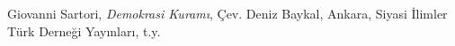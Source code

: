 \begin{thebibliography}{99}
 Giovanni Sartori, \textit{Demokrasi Kuramı}, Çev. Deniz Baykal, Ankara, Siyasi İlimler Türk Derneği Yayınları, t.y.
\end{thebibliography}
